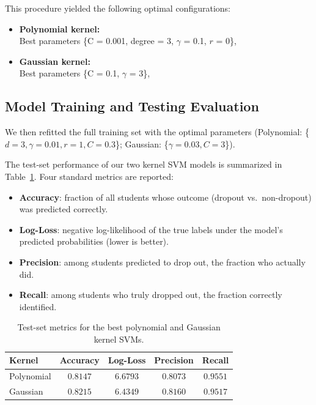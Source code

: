 \documentclass[12pt]{article}
\begin{document}
This procedure yielded the following optimal configurations:

\begin{itemize}
    \item \textbf{Polynomial kernel:}\\
    Best parameters \{C = 0.001, degree = 3, $\gamma$ = 0.1, $r$ = 0\},\\
    \item \textbf{Gaussian kernel:}\\
    Best parameters \{C = 0.1, $\gamma$ = 3\},\\
\end{itemize}

\subsection{Model Training and Testing Evaluation}

We then refitted the full training set with the optimal parameters (Polynomial: \{$d=3,\gamma=0.01,r=1,C=0.3$\}; Gaussian: \{$\gamma=0.03,C=3$\}).

The test-set performance of our two kernel SVM models is summarized in Table~\ref{tab:test_metrics}. Four standard metrics are reported:

\begin{itemize}
  \item \textbf{Accuracy}: fraction of all students whose outcome (dropout vs.\ non-dropout) was predicted correctly.
  \item \textbf{Log-Loss}: negative log-likelihood of the true labels under the model’s predicted probabilities (lower is better).
  \item \textbf{Precision}: among students predicted to drop out, the fraction who actually did.
  \item \textbf{Recall}: among students who truly dropped out, the fraction correctly identified.
\end{itemize}

\begin{table}[H]
\centering
\begin{tabular}{lcccc}
\toprule
\textbf{Kernel} & \textbf{Accuracy} & \textbf{Log-Loss} & \textbf{Precision} & \textbf{Recall} \\ \midrule
Polynomial & $0.8147$ & $6.6793$ & $0.8073$ & $0.9551$ \\
Gaussian   & $0.8215$ & $6.4349$ & $0.8160$ & $0.9517$ \\ 
\bottomrule
\end{tabular}
\caption{Test-set metrics for the best polynomial and Gaussian kernel SVMs.}
\label{tab:test_metrics}
\end{table}
\end{document}
